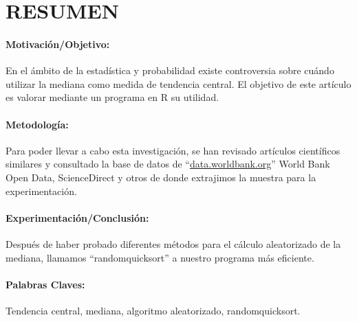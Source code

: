 \documentclass[a4 paper,12pt]{article}
\begin{document}
	\section*{RESUMEN}
	\paragraph{Motivación/Objetivo:}
	En el ámbito de la estadística y probabilidad existe controversia sobre cuándo utilizar la mediana como medida de tendencia central. El objetivo de este artículo es valorar mediante un programa en R su utilidad.
	\paragraph{Metodología:}
	Para poder llevar a cabo esta investigación, se han revisado artículos científicos similares y consultado la base de datos de “{\color{blue}\url{data.worldbank.org}}” World Bank Open Data, ScienceDirect y otros de donde extrajimos la muestra para la experimentación.
	\paragraph{Experimentación/Conclusión:}
	Después de haber probado diferentes métodos para el cálculo aleatorizado de la mediana, llamamos “randomquicksort” a nuestro programa más eficiente.
	\paragraph{Palabras Claves:}
	Tendencia central, mediana, algoritmo aleatorizado, randomquicksort.
\end{document}
